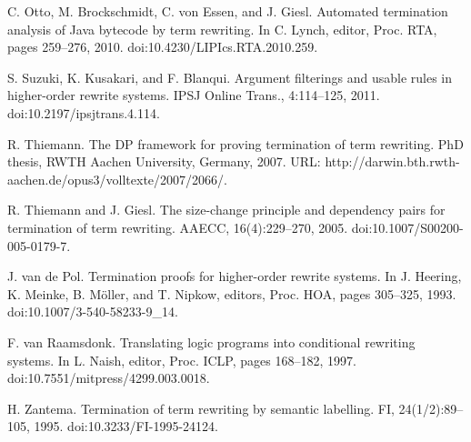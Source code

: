 \par\noindent  [39]  C. Otto, M. Brockschmidt, C. von Essen, and J. Giesl.  Automated termination analysis of Java bytecode by term rewriting.  In C. Lynch, editor, Proc. RTA, pages 259–276, 2010.  doi:10.4230/LIPIcs.RTA.2010.259.  
 
\par\noindent  [40]  S. Suzuki, K. Kusakari, and F. Blanqui.  Argument filterings and usable rules in higher-order rewrite systems.  IPSJ Online Trans., 4:114–125, 2011.  doi:10.2197/ipsjtrans.4.114.  
 
\par\noindent  [41]  R. Thiemann.  The DP framework for proving termination of term rewriting.  PhD thesis, RWTH Aachen University, Germany, 2007.  URL: http://darwin.bth.rwth-aachen.de/opus3/volltexte/2007/2066/.  
 
\par\noindent  [42]  R. Thiemann and J. Giesl.  The size-change principle and dependency pairs for termination of term rewriting.  AAECC, 16(4):229–270, 2005.  doi:10.1007/S00200-005-0179-7.  
 
\par\noindent  [43]  J. van de Pol.  Termination proofs for higher-order rewrite systems.  In J. Heering, K. Meinke, B. Möller, and T. Nipkow, editors, Proc. HOA, pages 305–325, 1993.  doi:10.1007/3-540-58233-9\_14.  
 
\par\noindent  [44]  F. van Raamsdonk.  Translating logic programs into conditional rewriting systems.  In L. Naish, editor, Proc. ICLP, pages 168–182, 1997.  doi:10.7551/mitpress/4299.003.0018.  
 
\par\noindent  [45]  H. Zantema.  Termination of term rewriting by semantic labelling.  FI, 24(1/2):89–105, 1995.  doi:10.3233/FI-1995-24124.  
  
